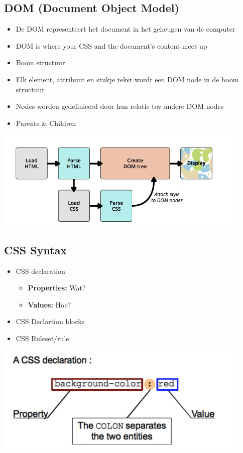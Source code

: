 \documentclass{article}
\newcommand{\bold}[1]{\textbf{#1}}
\begin{document}
\subsection{DOM (Document Object Model)}
\begin{itemize}
    \item De DOM representeert het document in het geheugen van de computer  
    \item DOM is where your CSS and the document's content meet up 
    \item Boom structuur 
    \item Elk element, attribuut en stukje tekst wordt een DOM node in de boom structuur 
    \item Nodes worden gedefinieerd door hun relatie tov andere DOM nodes 
    \item Parents \& Children
\end{itemize}




\includegraphics[width=0.9\textwidth]{img/Screenshot_20200212_151335.png}

\subsection{CSS Syntax}
\begin{itemize}
    \item CSS declaration 
    \begin{itemize}
        \item \bold{Properties:} Wat?
        \item \bold{Values:} Hoe?
    \end{itemize}
    \item CSS Declartion blocks
    \item CSS Ruleset/rule
\end{itemize}

\includegraphics[width=0.9\textwidth]{img/Screenshot_20200212_151458.png}
\end{document}
